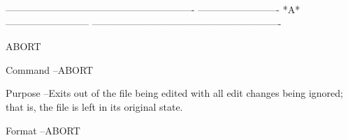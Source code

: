  
 
 
 
 
 
 
 
 
 
 
 
 
 
 
 
 
 
 
 
 
 
 
 
 
 
 
 
 
 
 
 
 
 
 
 
 
 
 
 
 
 
 
 
 
 
 
 
 
 
 
 
 
 
 
 
 
 
 
 
 
 
 
 
 
 
 
 
 
 
 
 
 
 
 
 
 
 
 
 
 
 
 
 
 
 
 
 
 
 
 
 
 
 
 
----------------------------------------------------------
-------------------------  *A*  --------------------------
----------------------------------------------------------
 
ABORT
 
Command --ABORT
 
Purpose --Exits out of the file being edited
          with all edit changes being ignored;
          that is, the file is left in its
          original state.
 
Format  --ABORT
 
